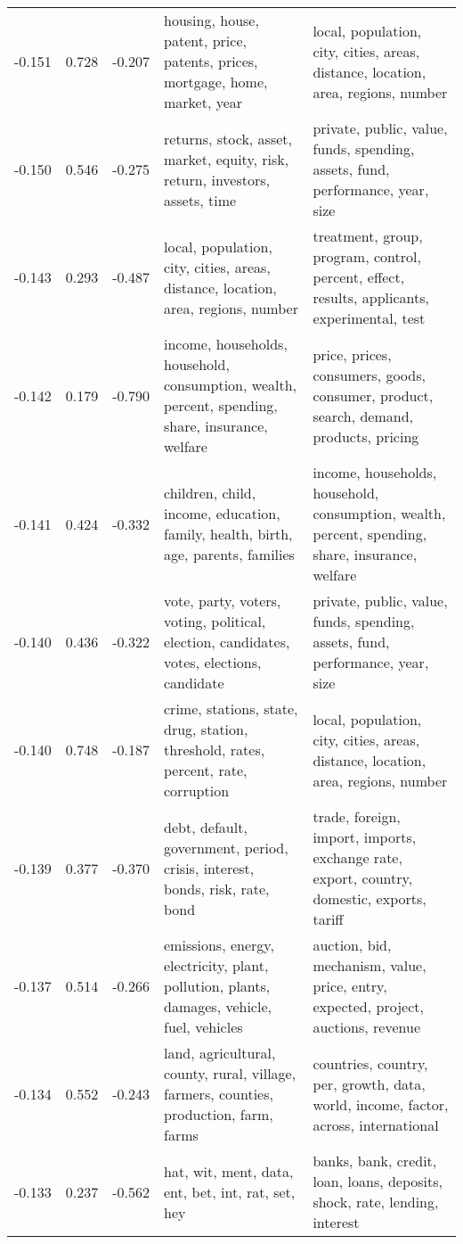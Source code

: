 \begin{tabular}{cccp{5cm}p{5cm}}
-0.151 & 0.728 & -0.207 & housing, house, patent, price, patents, prices, mortgage, home, market, year & local, population, city, cities, areas, distance, location, area, regions, number \\
-0.150 & 0.546 & -0.275 & returns, stock, asset, market, equity, risk, return, investors, assets, time & private, public, value, funds, spending, assets, fund, performance, year, size \\
-0.143 & 0.293 & -0.487 & local, population, city, cities, areas, distance, location, area, regions, number & treatment, group, program, control, percent, effect, results, applicants, experimental, test \\
-0.142 & 0.179 & -0.790 & income, households, household, consumption, wealth, percent, spending, share, insurance, welfare & price, prices, consumers, goods, consumer, product, search, demand, products, pricing \\
-0.141 & 0.424 & -0.332 & children, child, income, education, family, health, birth, age, parents, families & income, households, household, consumption, wealth, percent, spending, share, insurance, welfare \\
-0.140 & 0.436 & -0.322 & vote, party, voters, voting, political, election, candidates, votes, elections, candidate & private, public, value, funds, spending, assets, fund, performance, year, size \\
-0.140 & 0.748 & -0.187 & crime, stations, state, drug, station, threshold, rates, percent, rate, corruption & local, population, city, cities, areas, distance, location, area, regions, number \\
-0.139 & 0.377 & -0.370 & debt, default, government, period, crisis, interest, bonds, risk, rate, bond & trade, foreign, import, imports, exchange rate, export, country, domestic, exports, tariff \\
-0.137 & 0.514 & -0.266 & emissions, energy, electricity, plant, pollution, plants, damages, vehicle, fuel, vehicles & auction, bid, mechanism, value, price, entry, expected, project, auctions, revenue \\
-0.134 & 0.552 & -0.243 & land, agricultural, county, rural, village, farmers, counties, production, farm, farms & countries, country, per, growth, data, world, income, factor, across, international \\
-0.133 & 0.237 & -0.562 & hat, wit, ment, data, ent, bet, int, rat, set, hey & banks, bank, credit, loan, loans, deposits, shock, rate, lending, interest \\

\end{tabular}
